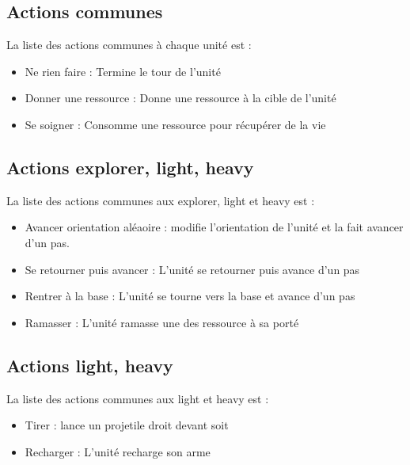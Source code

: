 \documentclass{report}
\begin{document}
\paragraph{}
\subsection{Actions communes}
La liste des actions communes à chaque unité est :
\begin{itemize}
\item Ne rien faire : Termine le tour de l'unité
\item Donner une ressource : Donne une ressource à la cible de l'unité
\item Se soigner : Consomme une ressource pour récupérer de la vie
\end{itemize}
\subsection{Actions explorer, light, heavy}
La liste des actions communes aux explorer, light et heavy est :
\begin{itemize}
\item Avancer orientation aléaoire : modifie l'orientation de l'unité et la fait avancer d'un pas.
\item Se retourner puis avancer : L'unité se retourner puis avance d'un pas
\item Rentrer à la base : L'unité se tourne vers la base et avance d'un pas
\item Ramasser : L'unité ramasse une des ressource à sa porté
\end{itemize}
\subsection{Actions light, heavy}
La liste des actions communes aux light et heavy est :
\begin{itemize}
\item Tirer : lance un projetile droit devant soit
\item Recharger : L'unité recharge son arme
\end{itemize}
\end{document}
